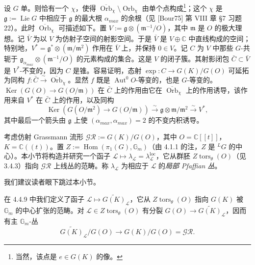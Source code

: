 设 $G$ 单。则恰有一个 $\chi$，使得 $\overline{\operatorname{Orb}}_\chi\setminus\operatorname{Orb}_\chi$ 由单个点构成\footnote{当然，该点是 $e\in G(K)$ 的像。}；这个 $\chi$ 是 $\mathfrak{g}:=\operatorname{Lie}G$ 中相应于 $\mathfrak{g}$ 的最大根 $\alpha_{max}$ 的余根（见 [Bour75] 第 VIII 章 §7 习题 22）。此时 $\overline{\operatorname{Orb}}_\chi$ 可描述如下。置 $V:=\mathfrak{g}\otimes(\mathfrak{m}^{-1}/O)$，其中 $\mathfrak{m}$ 是 $O$ 的极大理想。记 $\bar V$ 为以 $V$ 为仿射子空间的射影空间。于是 $\bar V$ 是 $V\oplus\mathbb{C}$ 中直线构成的空间；特别地，$V^*=\mathfrak{g}^*\otimes(\mathfrak{m}/\mathfrak{m}^2)$ 作用在 $\bar V$ 上，并保持 $0\in V$。记 $C$ 为 $V$ 中那些 $G$-共轭于 $\mathfrak{g}_{\alpha_{max}}\otimes(\mathfrak{m}^{-1}/O)$ 的元素构成的集合。这是 $V$ 的闭子簇。其射影闭包 $\bar C\subset\bar V$ 是 $V^*$-不变的，因为 $C$ 是锥。容易证明，态射 $\exp:C\to G(K)/G(O)$ 可延拓为同构 $f:\bar C\xrightarrow{\ \sim\ }\overline{\operatorname{Orb}}_\chi$。显然 $f$ 既是 $\operatorname{Aut}^0 O$-等变的，也是 $G$-等变的。$\operatorname{Ker}(G(O)\to G(O/\mathfrak{m}))$ 在 $\bar C$ 上的作用由它在 $\overline{\operatorname{Orb}}_\chi$ 上的作用诱导，该作用来自 $V^*$ 在 $\bar C$ 上的作用，以及同构
\[
\operatorname{Ker}(G(O/\mathfrak{m}^2)\to G(O/\mathfrak{m}))\xrightarrow{\ \sim\ }\mathfrak{g}\otimes\mathfrak{m}/\mathfrak{m}^2\xrightarrow{\ \sim\ }V^*,
\]
其中最后一个箭头由 $\mathfrak{g}$ 上使 $(\alpha_{max},\alpha_{max})=2$ 的不变内积诱导。


考虑仿射 Grassmann 流形 $\mathcal{GR}:=G(K)/G(O)$，其中 $O=\mathbb{C}[[t]]$，$K=\mathbb{C}((t))$。置 $Z:=\operatorname{Hom}(\pi_1(G),\mathbb{G}_m)$（由 4.1.1 的注，$Z$ 是 ${}^{L}G$ 的中心）。本小节将构造并研究一个函子 $\mathcal{L}\mapsto\lambda_{\mathcal{L}}=\lambda_{\mathcal{L}}^{\mathrm{loc}}$，它从群胚 $Z\operatorname{tors}_\theta(O)$（见 3.4.3）指向 $\mathcal{GR}$ 上线丛的范畴。称 $\lambda_{\mathcal{L}}$ 为相应于 $\mathcal{L}$ 的\emph{局部 Pfaffian 丛}。

我们建议读者眼下跳过本小节。

 在 4.4.9 中我们定义了函子 $\mathcal{L}\mapsto\widetilde{G(K)}_{\mathcal{L}}$，它从 $Z\operatorname{tors}_\theta(O)$ 指向 $G(K)$ 被 $\mathbb{G}_m$ 的中心扩张的范畴。对 $\mathcal{L}\in Z\operatorname{tors}_\theta(O)$ 有分裂 $G(O)\to\widetilde{G(K)}_{\mathcal{L}}$，因而有主 $\mathbb{G}_m$-丛
\begin{equation}\tag{232}
\widetilde{G(K)}_{\mathcal{L}}/G(O)\to G(K)/G(O)=\mathcal{GR}.
\end{equation}

